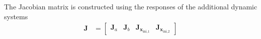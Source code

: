 The Jacobian matrix is constructed using the responses of the additional dynamic systems  
\begin{equation} \begin{aligned} \mathbf{J} &= \begin{bmatrix} \mathbf{J}_a & \mathbf{J}_b & \mathbf{J}_{\mathbf{x}_{\text{ini,1}}} & \mathbf{J}_{\mathbf{x}_{\text{ini,2}}} \end{bmatrix} \end{aligned} \end{equation}



\newpage

